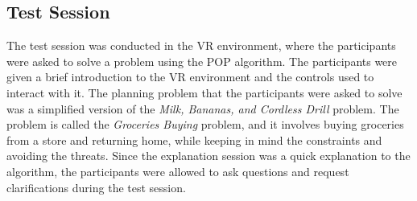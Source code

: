 \subsection{Test Session}
The test session was conducted in the \ac{VR} environment, where the participants were asked to solve a problem using the \ac{POP} algorithm. The participants were given a brief introduction to the \ac{VR} environment and the controls used to interact with it. The planning problem that the participants were asked to solve was a simplified version of the \textit{Milk, Bananas, and Cordless Drill} problem. The problem is called the \textit{Groceries Buying} problem, and it involves buying groceries from a store and returning home, while keeping in mind the constraints and avoiding the threats. Since the explanation session was a quick explanation to the algorithm, the participants were allowed to ask questions and request clarifications during the test session.
